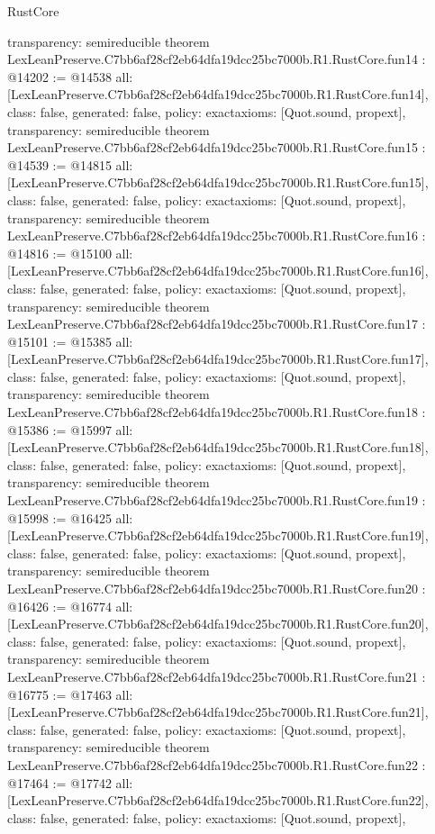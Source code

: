 \begin{lexlean}{RustCore}
\begin{coremodule}
{  transparency: semireducible
}
theorem LexLeanPreserve.C7bb6af28cf2eb64dfa19dcc25bc7000b.R1.RustCore.fun14 : @14202 := @14538 {
  all: [LexLeanPreserve.C7bb6af28cf2eb64dfa19dcc25bc7000b.R1.RustCore.fun14],
  class: false,
  generated: false,
  policy: exact{axioms: [Quot.sound, propext]},
  transparency: semireducible
}
theorem LexLeanPreserve.C7bb6af28cf2eb64dfa19dcc25bc7000b.R1.RustCore.fun15 : @14539 := @14815 {
  all: [LexLeanPreserve.C7bb6af28cf2eb64dfa19dcc25bc7000b.R1.RustCore.fun15],
  class: false,
  generated: false,
  policy: exact{axioms: [Quot.sound, propext]},
  transparency: semireducible
}
theorem LexLeanPreserve.C7bb6af28cf2eb64dfa19dcc25bc7000b.R1.RustCore.fun16 : @14816 := @15100 {
  all: [LexLeanPreserve.C7bb6af28cf2eb64dfa19dcc25bc7000b.R1.RustCore.fun16],
  class: false,
  generated: false,
  policy: exact{axioms: [Quot.sound, propext]},
  transparency: semireducible
}
theorem LexLeanPreserve.C7bb6af28cf2eb64dfa19dcc25bc7000b.R1.RustCore.fun17 : @15101 := @15385 {
  all: [LexLeanPreserve.C7bb6af28cf2eb64dfa19dcc25bc7000b.R1.RustCore.fun17],
  class: false,
  generated: false,
  policy: exact{axioms: [Quot.sound, propext]},
  transparency: semireducible
}
theorem LexLeanPreserve.C7bb6af28cf2eb64dfa19dcc25bc7000b.R1.RustCore.fun18 : @15386 := @15997 {
  all: [LexLeanPreserve.C7bb6af28cf2eb64dfa19dcc25bc7000b.R1.RustCore.fun18],
  class: false,
  generated: false,
  policy: exact{axioms: [Quot.sound, propext]},
  transparency: semireducible
}
theorem LexLeanPreserve.C7bb6af28cf2eb64dfa19dcc25bc7000b.R1.RustCore.fun19 : @15998 := @16425 {
  all: [LexLeanPreserve.C7bb6af28cf2eb64dfa19dcc25bc7000b.R1.RustCore.fun19],
  class: false,
  generated: false,
  policy: exact{axioms: [Quot.sound, propext]},
  transparency: semireducible
}
theorem LexLeanPreserve.C7bb6af28cf2eb64dfa19dcc25bc7000b.R1.RustCore.fun20 : @16426 := @16774 {
  all: [LexLeanPreserve.C7bb6af28cf2eb64dfa19dcc25bc7000b.R1.RustCore.fun20],
  class: false,
  generated: false,
  policy: exact{axioms: [Quot.sound, propext]},
  transparency: semireducible
}
theorem LexLeanPreserve.C7bb6af28cf2eb64dfa19dcc25bc7000b.R1.RustCore.fun21 : @16775 := @17463 {
  all: [LexLeanPreserve.C7bb6af28cf2eb64dfa19dcc25bc7000b.R1.RustCore.fun21],
  class: false,
  generated: false,
  policy: exact{axioms: [Quot.sound, propext]},
  transparency: semireducible
}
theorem LexLeanPreserve.C7bb6af28cf2eb64dfa19dcc25bc7000b.R1.RustCore.fun22 : @17464 := @17742 {
  all: [LexLeanPreserve.C7bb6af28cf2eb64dfa19dcc25bc7000b.R1.RustCore.fun22],
  class: false,
  generated: false,
  policy: exact{axioms: [Quot.sound, propext]},
}
\end{coremodule}
\end{lexlean}
